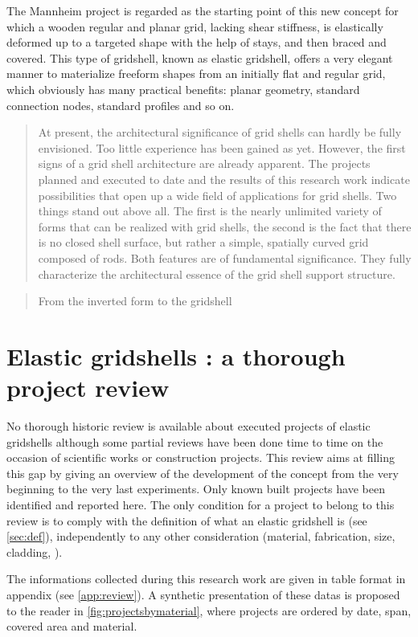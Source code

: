The Mannheim project is regarded as the starting point of this new concept for which a wooden regular and planar grid, lacking shear stiffness, is elastically deformed up to a targeted shape with the help of stays, and then braced and covered.
This type of gridshell, known as elastic gridshell, offers a very elegant manner to materialize freeform shapes from an initially flat and regular grid, which obviously has many practical benefits: planar geometry, standard connection nodes, standard profiles and so on.


\blockcquote[][p.~250]{IL10}{At present, the architectural significance of grid shells can hardly be fully envisioned. Too little experience has been gained as yet. However, the first signs of a grid shell architecture are already apparent. The projects planned and executed to date and the results of this research work indicate possibilities that open up a wide field of applications for grid shells. Two things stand out above all. The first is the nearly unlimited variety of forms that can be realized with grid shells, the second is the fact that there is no closed shell surface, but rather a simple, spatially curved grid composed of rods. Both features are of fundamental significance. They fully characterize the architectural essence of the grid shell support structure.}

\blockcquote[][p.~179]{IL10}{From the inverted form to the gridshell}

\newpage
\phantom{abc}
\clearpage



\section{Elastic gridshells : a thorough project review}

No thorough historic review is available about executed projects of elastic gridshells although some partial reviews have been done time to time on the occasion of scientific works or construction projects. This review aims at filling this gap by giving an overview of the development of the concept from the very beginning to the very last experiments. Only known built projects have been identified and reported here. The only condition for a project to belong to this review is to comply with the definition of what an elastic gridshell is (see \cref{sec:def}), independently to any other consideration (material, fabrication, size, cladding, \telp{}).

The informations collected during this research work are given in table format in appendix (see \cref{app:review}). A synthetic presentation of these datas is proposed to the reader in \cref{fig:projectsbymaterial}, where projects are ordered by date, span, covered area and material.

